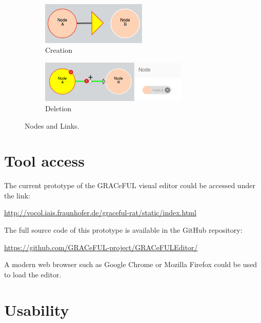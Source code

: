 \documentclass[a4paper]{article}
\begin{document}
\begin{figure}[H]
 
\begin{subfigure}{0.5\textwidth}
\includegraphics[width=0.8\linewidth, height=2cm]{img/node_link.png} 
\caption{Creation}
\label{fig:node_link}
\end{subfigure}
\begin{subfigure}{0.5\textwidth}
\includegraphics[width=1.2\linewidth, height=2cm]{img/delete_nodeLink.png}
\caption{Deletion}
\label{fig:delete}
\end{subfigure}
 
\caption{Nodes and Links.}
\end{figure}

\section{Tool access}
\label{proto}

The current prototype of the GRACeFUL visual editor could be accessed under the link: 

\begin{center}
 \url{http://vocol.iais.fraunhofer.de/graceful-rat/static/index.html}
 \end{center} 

The full source code of this prototype is available in the GitHub repository: 

\begin{center}
\url{https://github.com/GRACeFUL-project/GRACeFULEditor/}
\end{center}

A modern web browser such as Google Chrome or Mozilla Firefox could be used to load the editor. 

\section{Usability}
\label{usability}
\end{document}
